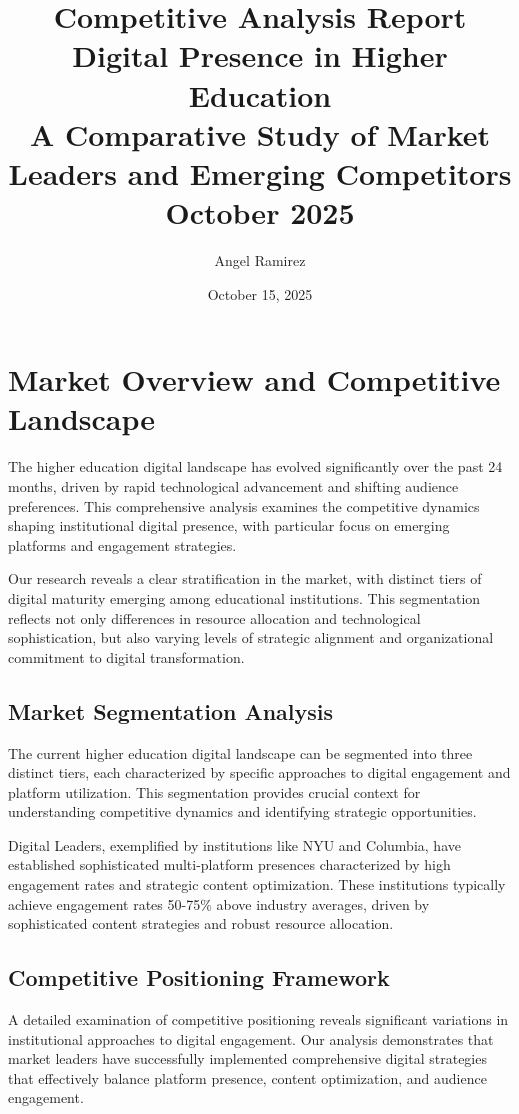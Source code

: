 \documentclass[12pt]{report}
\title{
    \Huge\textbf{Competitive Analysis Report}\\[1cm]
    \Large\textbf{Digital Presence in Higher Education}\\[0.5cm]
    \large A Comparative Study of Market Leaders and Emerging Competitors\\[1cm]
    \normalsize October 2025
}
\author{Angel Ramirez}
\date{October 15, 2025}
\begin{document}
\maketitle

\tableofcontents

\chapter{Market Overview and Competitive Landscape}

The higher education digital landscape has evolved significantly over the past 24 months, driven by rapid technological advancement and shifting audience preferences. This comprehensive analysis examines the competitive dynamics shaping institutional digital presence, with particular focus on emerging platforms and engagement strategies.

Our research reveals a clear stratification in the market, with distinct tiers of digital maturity emerging among educational institutions. This segmentation reflects not only differences in resource allocation and technological sophistication, but also varying levels of strategic alignment and organizational commitment to digital transformation.

\section{Market Segmentation Analysis}

The current higher education digital landscape can be segmented into three distinct tiers, each characterized by specific approaches to digital engagement and platform utilization. This segmentation provides crucial context for understanding competitive dynamics and identifying strategic opportunities.

Digital Leaders, exemplified by institutions like NYU and Columbia, have established sophisticated multi-platform presences characterized by high engagement rates and strategic content optimization. These institutions typically achieve engagement rates 50-75\% above industry averages, driven by sophisticated content strategies and robust resource allocation.

\section{Competitive Positioning Framework}

A detailed examination of competitive positioning reveals significant variations in institutional approaches to digital engagement. Our analysis demonstrates that market leaders have successfully implemented comprehensive digital strategies that effectively balance platform presence, content optimization, and audience engagement.
\end{document}
